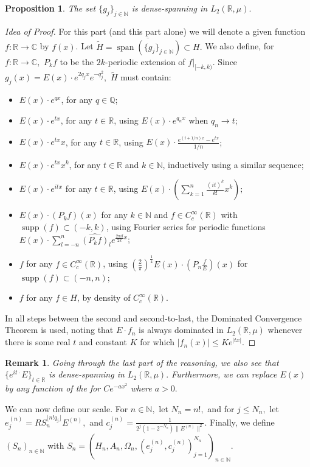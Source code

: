 \documentclass[10pt,a4paper]{amsart}
\newtheorem{prop}[thm]{Proposition}
\newtheorem{remark}[thm]{Remark}
\def \Span{\operatorname{span}}
\begin{document}
\begin{prop}
	The set $\{g_j\}_{j\in\mathbb{N}}$ is dense-spanning in $L_2(\mathbb{R},\mu).$
\end{prop}
\begin{proof}[Idea of Proof]
	For this part (and this part alone) we will denote a given function $f:\mathbb{R}\rightarrow\mathbb{C}$ by $f(x)$.  Let $\tilde{H}=\overline{\Span(\{g_j\}_{j\in\mathbb{N}})}\subset H.$ We also define, for $f:\mathbb{R}\rightarrow \mathbb{C},$ $P_k f$ to be the $2k$-periodic extension of $f|_{[-k,k)}.$ Since $g_j(x)=E(x)\cdot e^{2q_j x}e^{-q_j^2},$ $\tilde{H}$ must contain:
	\begin{itemize}
		\item $E(x)\cdot e^{qx}$, for any $q\in \mathbb{Q}$;
		\item $E(x)\cdot e^{tx}$, for any $t\in\mathbb{R}$, using $E(x)\cdot e^{q_nx}$ when $q_n\rightarrow t$;
		\item $E(x)\cdot e^{tx} x$, for any $t\in\mathbb{R}$, using $E(x)\cdot \frac{e^{(t+1/n)x}-e^{tx}}{1/n}$;
		\item $E(x)\cdot e^{tx} x^k$, for any $t\in\mathbb{R}$ and $k\in\mathbb{N}$, inductively using a similar sequence;
		\item  $E(x)\cdot e^{itx}$ for any $t\in\mathbb{\mathbb{R}}$, using $E(x)\cdot \left(\sum_{k=1}^n\frac{(it)^k}{k!}x^k\right);$
		\item $E(x)\cdot (P_kf)(x)$ for any $k\in\mathbb{N}$ and $f\in C_c^{\infty}(\mathbb{R})$ with $\operatorname{supp}(f)\subset(-k,k)$, using Fourier series for periodic functions $E(x)\cdot \sum_{l=-n}^n\widehat{(P_kf)}_le^{ \frac{2\pi i l}{2k}x}$;
		\item $f$ for any $f\in C_c^{\infty}(\mathbb{R})$, using $\left(\frac{2}{\pi}\right)^{\frac{1}{4}}E(x)\cdot (P_n\frac{f}{E})(x)$ for $\operatorname{supp}(f)\subset(-n,n)$;
		\item $f$ for any $f\in H$, by density of $C_c^{\infty}(\mathbb{R}).$
	\end{itemize}
	In all steps between the second and second-to-last, the Dominated Convergence Theorem is used, noting that $E\cdot f_n$ is always dominated in $L_2(\mathbb{R},\mu)$ whenever there is some real $t$ and constant $K$ for which $|f_n(x)|\leq Ke^{|tx|}$.  
\end{proof}
\begin{remark}\label{remark_dense_gaussian}
	Going through the last part of the reasoning, we also see that $\{e^{it\cdot} E\}_{t\in\mathbb{R}}$ is dense-spanning in $L_2(\mathbb{R},\mu).$ Furthermore, we can replace $E(x)$ by any function of the for $Ce^{-a x^2}$ where $a>0.$
\end{remark}
We can now define our scale. For $n\in\mathbb{N},$ let $N_n=n!,$ and for $j\leq N_n,$ let $e_j^{(n)}=RS_n^{\lfloor n!q_j\rfloor} E^{(n)},$ and $c_j^{(n)}=\frac{1}{2^j(1-2^{-N_n})\|E^{(n)}\|^2}.$ Finally, we define $(S_n)_{n\in\mathbb{N}}$ with $S_n=(H_n,A_n,\Omega_n, (e_j^{(n)},c_j^{(n)})_{j=1}^{N_n})_{n\in\mathbb{N}}.$
\end{document}
